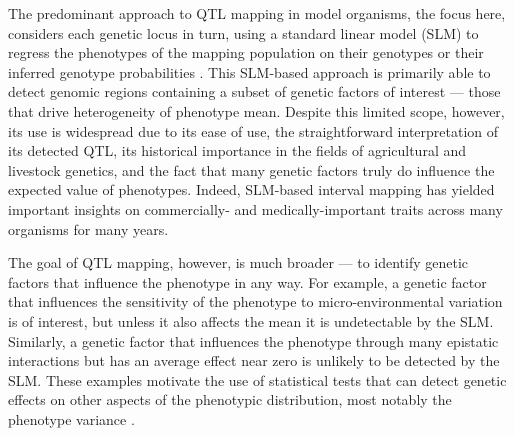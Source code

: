 The predominant approach to QTL mapping in model organisms, the focus here, considers each genetic locus in turn, using a standard linear model (SLM) to regress the phenotypes of the mapping population on their genotypes or their inferred genotype probabilities \citep{Lander1989a,Haley1992}.
This SLM-based approach is primarily able to detect genomic regions containing a subset of genetic factors of interest --- those that drive heterogeneity of phenotype mean.
Despite this limited scope, however, its use is widespread due to its ease of use, the straightforward interpretation of its detected QTL, its historical importance in the fields of agricultural and livestock genetics, and the fact that many genetic factors truly do influence the expected value of phenotypes.
Indeed, SLM-based interval mapping has yielded important insights on commercially- and medically-important traits across many organisms for many years.


The goal of QTL mapping, however, is much broader --- to identify genetic factors that influence the phenotype in any way.
For example, a genetic factor that influences the sensitivity of the phenotype to micro-environmental variation is of interest, but unless it also affects the mean it is undetectable by the SLM.
Similarly, a genetic factor that influences the phenotype through many epistatic interactions but has an average effect near zero is unlikely to be detected by the SLM.
These examples motivate the use of statistical tests that can detect genetic effects on other aspects of the phenotypic distribution, most notably the phenotype variance \citep{Pare2010}.

